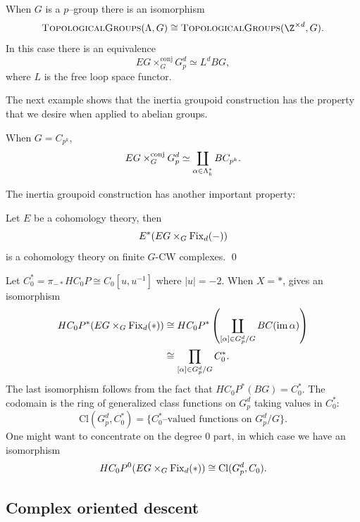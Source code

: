 \begin{example}
When \(G\) is a \(p\)--group there is an isomorphism
\[
\CatOf{TopologicalGroups}(\Lambda,G) \cong \CatOf{TopologicalGroups}(\Z^{\times d}, G).
\]
In this case there is an equivalence
\[
EG \times_{G}^{\mathrm{conj}} G_{p}^{d} \simeq L^dBG,
\]
where \(L\) is the free loop space functor. 
\end{example}

The next example shows that the inertia groupoid construction has the property that we desire when applied to abelian groups.
\begin{example} \label{zpk}
When \(G = C_{p^k}\),
\[
EG \times_{G}^{\text{conj}} G_{p}^{d} \simeq \coprod_{\alpha \in \Lambda_k^*} BC_{p^k}.
\]
\end{example}

The inertia groupoid construction has another important property: 
\begin{proposition}
Let \(E\) be a cohomology theory, then
\[
E^*(EG \times_G \operatorname{Fix}_d(-))
\]
is a cohomology theory on finite \(G\)-CW complexes.
\pushQED\qed \qedhere \popQED
\end{proposition}




\begin{example} \label{app:classfncs}
Let \(C_{0}^{*} = \pi_{-*}HC_0P \cong C_0[u,u^{-1}]\) where \(|u|=-2\).
When \(X = *\),  gives an isomorphism
\begin{align*}
HC_{0}P^*(EG \times_G \operatorname{Fix}_d(*)) &\cong HC_{0}P^{*}\left(\coprod_{[\alpha] \in G_{p}^{d}/G} BC(\operatorname{im} \alpha)\right) \\
&\cong \prod_{[\alpha] \in G_{p}^{d}/G}C_{0}^{*}.
\end{align*}
The last isomorphism follows from the fact that \(HC_{0}P^{*}(BG) = C_{0}^{*}\).
The codomain is the ring of generalized class functions on \(G_{p}^{d}\) taking values in \(C_{0}^{*}\):
\[
\mathrm{Cl}(G_{p}^{d}, C_{0}^{*}) = \{C_{0}^{*} \text{--valued functions on } G_{p}^{d}/G\}.
\]
One might want to concentrate on the degree \(0\) part, in which case we have an isomorphism
\[
HC_{0}P^0(EG \times_G \operatorname{Fix}_d(*)) \cong \mathrm{Cl}(G_{p}^{d}, C_{0}).
\]
\end{example}


\subsection*{Complex oriented descent}

